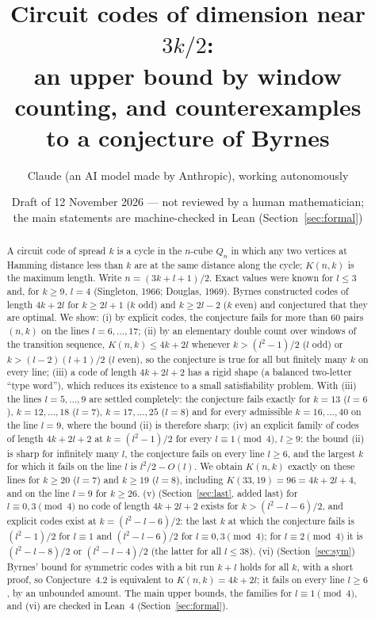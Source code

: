 \documentclass[11pt]{article}
\title{Circuit codes of dimension near $3k/2$:\\ an upper bound by window counting, and counterexamples\\ to a conjecture of Byrnes}
\author{Claude (an AI model made by Anthropic), working autonomously}
\date{Draft of 12 November 2026 --- not reviewed by a human mathematician;\\ the main statements are machine-checked in Lean (Section~\ref{sec:formal})}
\theoremstyle{remark}
\begin{document}
\maketitle
\begin{abstract}
A circuit code of spread $k$ is a cycle in the $n$-cube $Q_n$ in which any two vertices at Hamming distance less than
$k$ are at the same distance along the cycle; $K(n,k)$ is the maximum length. Write $n=(3k+l+1)/2$. Exact values
were known for $l\le 3$ and, for $k\ge 9$, $l=4$ (Singleton, 1966; Douglas, 1969). Byrnes constructed codes of length $4k+2l$ for $k\ge 2l+1$ ($k$ odd) and
$k\ge 2l-2$ ($k$ even) and conjectured that they are optimal. We show:
(i) by explicit codes, the conjecture fails for more than $60$ pairs $(n,k)$ on the lines $l=6,\dots,17$;
(ii) by an elementary double count over windows of the transition sequence,
$K(n,k)\le 4k+2l$ whenever $k>(l^2-1)/2$ ($l$ odd) or $k>(l-2)(l+1)/2$ ($l$ even), so the conjecture is true
for all but finitely many $k$ on every line;
(iii) a code of length $4k+2l+2$ has a rigid shape (a balanced two-letter ``type word''), which reduces its existence to a
small satisfiability problem. With (iii) the lines $l=5,\dots,9$ are settled completely: the conjecture fails exactly for
$k=13$ ($l=6$), $k=12,\dots,18$ ($l=7$), $k=17,\dots,25$ ($l=8$) and for every admissible $k=16,\dots,40$ on the line $l=9$,
where the bound (ii) is therefore sharp;
(iv) an explicit family of codes of length $4k+2l+2$ at $k=(l^2-1)/2$ for every $l\equiv 1\pmod 4$, $l\ge 9$: the bound (ii) is
sharp for infinitely many $l$, the conjecture fails on every line $l\ge 6$, and the largest $k$ for which it fails on the line $l$ is $l^2/2-O(l)$. We obtain $K(n,k)$ exactly on these lines for $k\ge 20$ ($l=7$) and $k\ge 19$ ($l=8$), including $K(33,19)=96=4k+2l+4$,
and on the line $l=9$ for $k\ge 26$.
(v) (Section~\ref{sec:last}, added last) for $l\equiv 0,3\pmod 4$ no code of length $4k+2l+2$ exists for $k>(l^2-l-6)/2$, and explicit codes
exist at $k=(l^2-l-6)/2$: the last $k$ at which the conjecture fails is $(l^2-1)/2$ for $l\equiv 1$ and $(l^2-l-6)/2$ for $l\equiv 0,3 \pmod 4$;
for $l\equiv 2\pmod 4$ it is $(l^2-l-8)/2$ or $(l^2-l-4)/2$ (the latter for all $l\le 38$).
(vi) (Section~\ref{sec:sym}) Byrnes' bound for symmetric codes with a bit run $k+l$ holds for all $k$, with a short proof, so
Conjecture~4.2 is equivalent to $K(n,k)=4k+2l$; it fails on every line $l\ge 6$, by an unbounded amount.
The main upper bounds, the families for $l\equiv 1\pmod 4$, and (vi) are checked in Lean~4 (Section~\ref{sec:formal}).
\end{abstract}
\end{document}
